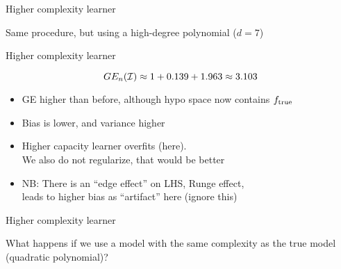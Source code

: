 \documentclass[11pt,compress,t,notes=noshow, xcolor=table]{beamer}
\begin{document}
\begin{framei}[sep=M]{Higher complexity learner}

\item Same procedure, but using a high-degree polynomial ($d=7$)


\end{framei} 

\begin{frame}{Higher complexity learner}

  \splitVThree
  {}
  {}
  {}


$$GE_n(\mathcal{I}) \approx 1 + 0.139 + 1.963 \approx 3.103 $$

\vfill

\begin{itemize}
\item GE higher than before, although hypo space now contains $f_{\text{true}}$
\item Bias is lower, and variance higher 
\item Higher capacity learner overfits (here).\\
   We also do not regularize, that would be better
   
\item NB: There is an ``edge effect'' on LHS, Runge effect,\\
  leads to higher bias as ``artifact'' here (ignore this)
\end{itemize}

\end{frame}

\begin{framei}[sep=M]{Higher complexity learner}

\item What happens if we use a model with the same complexity as the true model (quadratic polynomial)? 


\end{framei}
\end{document}

